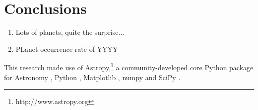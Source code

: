 \documentclass[onecolumn]{aa} %
\begin{document}
\section{Conclusions}\label{sec:conclusion}

   \begin{enumerate}
      \item Lots of planets, quite the surprise...
      \item PLanet occurrence rate of YYYY
   \end{enumerate}

\begin{acknowledgements}
This research made use of Astropy,\footnote{http://www.astropy.org} a community-developed core Python package for Astronomy \citep{astropy:2013, astropy:2018}, Python \citep{vanRossum95,Oliphant07}, Matplotlib \citep{Hunter07}, numpy \citep{Oliphant06,vanderWalt11} and SciPy \citep{Virtanen20}.
\end{acknowledgements}



\end{document}
